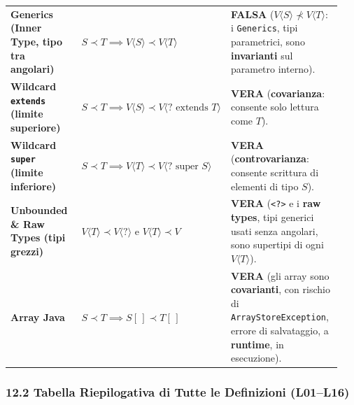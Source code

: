 \begin{longtable}{>{\raggedright\arraybackslash}p{0.27\linewidth}>{\raggedright\arraybackslash}p{0.29\linewidth}>{\raggedright\arraybackslash}p{0.38\linewidth}}
\textbf{Generics (Inner Type, tipo tra angolari)} & $S \prec T \implies V\langle S \rangle \prec V\langle T \rangle$ & \textbf{FALSA} ($V\langle S \rangle \not\prec V\langle T \rangle$: i \texttt{Generics}, tipi parametrici, sono \textbf{invarianti} sul parametro interno). \\

\textbf{Wildcard \texttt{extends} (limite superiore)} & $S \prec T \implies V\langle S \rangle \prec V\langle ? \text{ extends } T \rangle$ & \textbf{VERA} (\textbf{covarianza}: consente solo lettura come $T$). \\

\textbf{Wildcard \texttt{super} (limite inferiore)} & $S \prec T \implies V\langle T \rangle \prec V\langle ? \text{ super } S \rangle$ & \textbf{VERA} (\textbf{controvarianza}: consente scrittura di elementi di tipo $S$). \\

\textbf{Unbounded \& Raw Types (tipi grezzi)} & $V\langle T \rangle \prec V\langle ? \rangle$ e $V\langle T \rangle \prec V$ & \textbf{VERA} (\texttt{<?>} e i \textbf{raw types}, tipi generici usati senza angolari, sono supertipi di ogni $V\langle T \rangle$). \\

\textbf{Array Java} & $S \prec T \implies S[\,] \prec T[\,]$ & \textbf{VERA} (gli array sono \textbf{covarianti}, con rischio di \texttt{ArrayStoreException}, errore di salvataggio, a \textbf{runtime}, in esecuzione). \\

\bottomrule

\end{longtable}
\endgroup

\subsubsection{12.2 Tabella Riepilogativa di Tutte le Definizioni (L01–L16)}\label{12-2-tabella-riepilogativa-di-tutte-le-definizioni-l01-l16}

